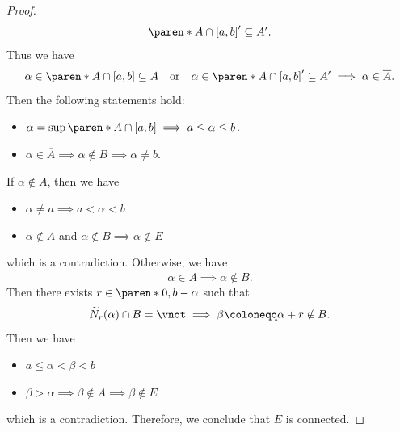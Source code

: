 \begin{proof}
  \[
    \paren*{A \cap [a, b]}' \subseteq A'.
  \]
  Thus we have
  \[
    \alpha \in \paren*{A \cap [a, b]} \subseteq A \quad \text{or} \quad
    \alpha \in \paren*{A \cap [a, b]}' \subseteq A' \implies \alpha \in \overline{A}.
  \]
  Then the following statements hold:
  \begin{itemize}
    \item $\alpha = \sup\paren*{A \cap [a, b]} \implies a \leq \alpha \leq b$.
    \item $\alpha \in \overline{A} \implies \alpha \notin B \implies \alpha \neq b$.
  \end{itemize}
  If $\alpha \notin A$, then we have
  \begin{itemize}
    \item $\alpha \neq a \implies a < \alpha < b$
    \item $\alpha \notin A$ and $\alpha \notin B \implies \alpha \notin E$
  \end{itemize}
  which is a contradiction. Otherwise, we have
  \[
    \alpha \in A \implies \alpha \notin \overline{B}.
  \]
  Then there exists $r \in \paren*{0, b - \alpha}$ such that
  \[
    \widetilde{N}_{r}(\alpha) \cap B = \vnot \implies \beta \coloneqq \alpha + r \notin B.
  \]
  Then we have
  \begin{itemize}
    \item $a \leq \alpha < \beta < b$
    \item $\beta > \alpha \implies \beta \notin A \implies \beta \notin E$
  \end{itemize}
  which is a contradiction. Therefore, we conclude that $E$ is connected.
\end{proof}
